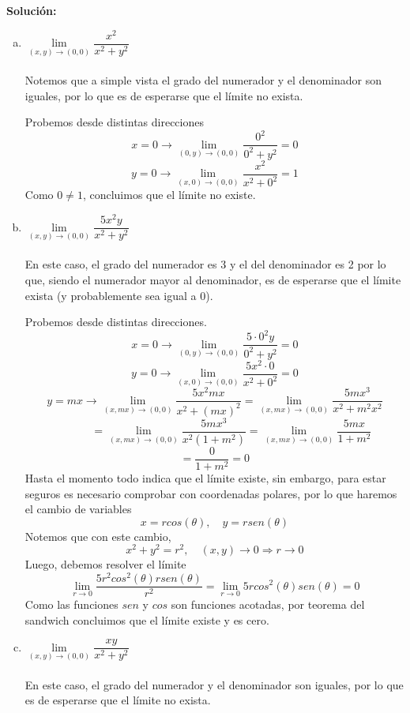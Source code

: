 \documentclass[12pt]{article}
\newenvironment{solucion}
{\begin{mdframed}[backgroundcolor=black!10]
		{\bf Solución:}\\
	}
	{
	\end{mdframed}
}
\newenvironment{preguntas}
{\begin{enumerate}\itemsep12pt
	}
	{
	\end{enumerate}
}
\newcommand{\ra}{\rightarrow}
\begin{document}
\begin{preguntas}
\begin{solucion}
\begin{enumerate}[a)]
\item $\lim\limits_{(x,y) \to (0,0)} \dfrac{x^2}{x^2+y^2}$\\
			\\
			Notemos que a simple vista el grado del numerador y el denominador son iguales, por lo que es de esperarse que el límite no exista.
			
			Probemos desde distintas direcciones
			$$x = 0 \ra \lim\limits_{(0,y) \to (0,0)} \dfrac{0^2}{0^2+y^2}
			= 0$$
			$$y = 0 \ra \lim\limits_{(x,0) \to (0,0)} \dfrac{x^2}{x^2+0^2}
			= 1$$
			Como $0 \neq 1$, concluimos que el límite no existe.
\item $\lim\limits_{(x,y) \to (0,0)} \dfrac{5x^2y}{x^2+y^2}$\\
			\\
			En este caso, el grado del numerador es 3 y el del denominador es 2 por lo que, siendo el numerador mayor al denominador, es de esperarse que el límite exista (y probablemente sea igual a 0).
			
			Probemos desde distintas direcciones.
			$$x = 0 \ra \lim\limits_{(0,y) \to (0,0)} \dfrac{5\cdot0^2y}{0^2+y^2} = 0$$
			$$y = 0 \ra \lim\limits_{(x,0) \to (0,0)} \dfrac{5x^2\cdot 0}{x^2+0^2} = 0$$
			$$y = mx \ra \lim\limits_{(x,mx) \to (0,0)} \dfrac{5x^2 mx}{x^2+(mx)^2}
			= \lim\limits_{(x,mx) \to (0,0)} \dfrac{5mx^3}{x^2+m^2x^2}$$
			$$\qquad \quad = \lim\limits_{(x,mx) \to (0,0)} \dfrac{5mx^3}{x^2(1+m^2)}
			= \lim\limits_{(x,mx) \to (0,0)} \dfrac{5mx}{1+m^2}$$
			$$= \dfrac{0}{1+m^2} = 0$$
			Hasta el momento todo indica que el límite existe, sin embargo, para estar seguros es necesario comprobar con coordenadas polares, por lo que haremos el cambio de variables
			$$x = rcos(\theta), \quad y = rsen(\theta)$$
			Notemos que con este cambio,
			$$x^2+y^2 = r^2, \quad (x,y)\ra 0 \Longrightarrow r \ra 0$$
			Luego, debemos resolver el límite
			$$\lim\limits_{r\ra 0} \dfrac{5r^2cos^2(\theta)rsen(\theta)}{r^2}
			= \lim\limits_{r\ra 0} 5rcos^2(\theta)sen(\theta) = 0$$
			Como las funciones $sen$ y $cos$ son funciones acotadas, por teorema del sandwich concluimos que el límite existe y es cero.
\item $\lim\limits_{(x,y) \to (0,0)} \dfrac{xy}{x^2+y^2}$\\
			\\
			En este caso, el grado del numerador y el denominador son iguales, por lo que es de esperarse que el límite no exista.
			

\end{enumerate}
\end{solucion}
\end{preguntas}
\end{document}
